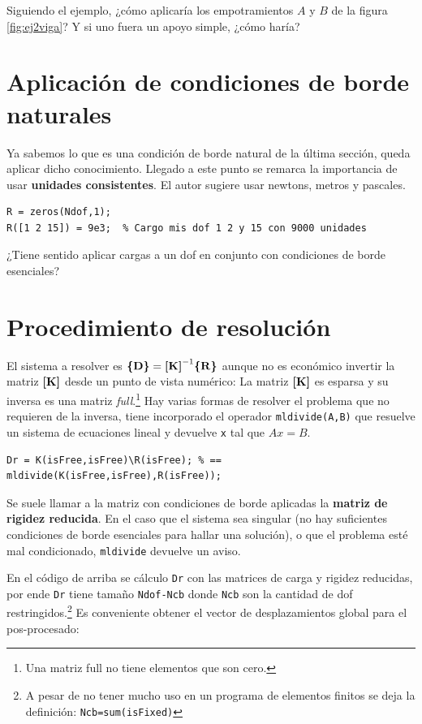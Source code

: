 Siguiendo el ejemplo, ¿cómo aplicaría los empotramientos $A$ y $B$ de la figura \ref{fig:ej2viga}? Y si uno fuera un apoyo simple, ¿cómo haría? 



\section{Aplicación de condiciones de borde naturales}
Ya sabemos lo que es una condición de borde natural de la última sección, queda aplicar dicho conocimiento. Llegado a este punto se remarca la importancia de usar \textbf{unidades consistentes}. El autor sugiere usar newtons, metros y pascales.  

\begin{lstlisting}[caption = {Condiciones de borde naturales (cargas).}]
R = zeros(Ndof,1);
R([1 2 15]) = 9e3;  % Cargo mis dof 1 2 y 15 con 9000 unidades
\end{lstlisting}

¿Tiene sentido aplicar cargas a un dof en conjunto con condiciones de borde esenciales?

\section{Procedimiento de resolución}
El sistema a resolver es $\boldsymbol{\{ }\mathbf{D} \boldsymbol{\}}=\boldsymbol{[}\mathbf{K} \boldsymbol{]}^{-1}\boldsymbol{\{ }\mathbf{R} \boldsymbol{\}}$ aunque no es económico invertir la matriz $\boldsymbol{[}\mathbf{K} \boldsymbol{]}$ desde un punto de vista numérico: La matriz $\boldsymbol{[}\mathbf{K} \boldsymbol{]}$ es esparsa y su inversa es una matriz \textit{full}.\footnote{Una matriz full no tiene elementos que son cero.} Hay varias formas de resolver el problema que no requieren de la inversa, \Matlab{} tiene incorporado el operador \texttt{mldivide(A,B)} que resuelve un sistema de ecuaciones lineal y devuelve \texttt{x} tal que $Ax=B$. 

\begin{lstlisting}[caption = {Resolución del sistema lineal.}]
Dr = K(isFree,isFree)\R(isFree); % == mldivide(K(isFree,isFree),R(isFree));
\end{lstlisting}
Se suele llamar a la matriz con condiciones de borde aplicadas la \textbf{matriz de rigidez reducida}. En el caso que el sistema sea singular (no hay suficientes condiciones de borde esenciales para hallar una solución), o que el problema esté mal condicionado, \texttt{mldivide} devuelve un aviso.  

En el código de arriba se cálculo \texttt{Dr} con las matrices de carga y rigidez reducidas, por ende \texttt{Dr} tiene tamaño \texttt{Ndof-Ncb} donde \texttt{Ncb} son la cantidad de dof restringidos.\footnote{A pesar de no tener mucho uso en un programa de elementos finitos se deja la definición: \texttt{Ncb=sum(isFixed)}} Es conveniente obtener el vector de desplazamientos global para el pos-procesado:

